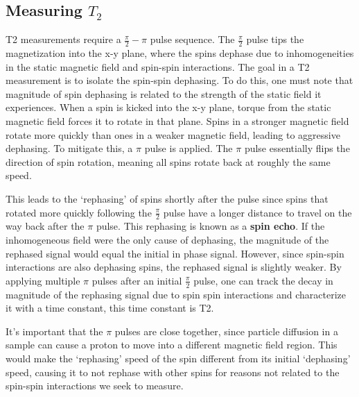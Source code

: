 \documentclass[
    floatfix,  %
    reprint,
    amsmath,
    amssymb,
    aps,
]{revtex4-2}
\newcommand{\halfpi}{\frac{\pi}{2}}
\begin{document}

\subsection{Measuring $T_2$\label{sec:measure-t2}}

T2 measurements require a $\halfpi-\pi$ pulse sequence. The $\halfpi$ pulse tips the magnetization into the x-y plane, where the spins dephase due to inhomogeneities in the static magnetic field and spin-spin interactions. The goal in a T2 measurement is to isolate the spin-spin dephasing.  To do this, one must note that magnitude of spin dephasing is related to the strength of the static field it experiences. When a spin is kicked into the x-y plane, torque from the static magnetic field forces it to rotate in that plane. Spins in a stronger magnetic field rotate more quickly than ones in a weaker magnetic field, leading to aggressive dephasing. To mitigate this, a $\pi$ pulse is applied. The $\pi$ pulse essentially flips the direction of spin rotation, meaning all spins rotate back at roughly the same speed.

This leads to the `rephasing' of spins shortly after the pulse since spins that rotated more quickly following the $\halfpi$ pulse have a longer distance to travel on the way back after the $\pi$ pulse. This rephasing is known as a \textbf{spin echo}. If the inhomogeneous field were the only cause of dephasing, the magnitude of the rephased signal would equal the initial in phase signal. However, since spin-spin interactions are also dephasing spins, the rephased signal is slightly weaker. By applying multiple $\pi$ pulses after an initial $\halfpi$ pulse, one can track the decay in magnitude of the rephasing signal due to spin spin interactions and characterize it with a time constant, this time constant is T2.

It's important that the $\pi$ pulses are close together, since particle diffusion in a sample can cause a proton to move into a different magnetic field region. This would make the `rephasing' speed of the spin different from its initial `dephasing' speed, causing it to not rephase with other spins for reasons not related to the spin-spin interactions we seek to measure.










\end{document}
